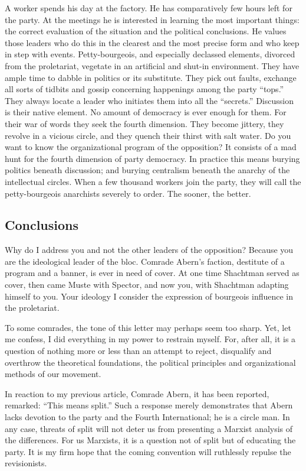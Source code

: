 A worker spends his day at the factory. He has comparatively few hours left for the party. At the meetings he is interested in learning the most important things: the correct evaluation of the situation and the political conclusions. He values those leaders who do this in the clearest and the most precise form and who keep in step with events. Petty-bourgeois, and especially declassed elements, divorced from the proletariat, vegetate in an artificial and shut-in environment. They have ample time to dabble in politics or its substitute. They pick out faults, exchange all sorts of tidbits and gossip concerning happenings among the party “tops.” They always locate a leader who initiates them into all the “secrets.” Discussion is their native element. No amount of democracy is ever enough for them. For their war of words they seek the fourth dimension. They become jittery, they revolve in a vicious circle, and they quench their thirst with salt water. Do you want to know the organizational program of the opposition? It consists of a mad hunt for the fourth dimension of party democracy. In practice this means burying politics beneath discussion; and burying centralism beneath the anarchy of the intellectual circles. When a few thousand workers join the party, they will call the petty-bourgeois anarchists severely to order. The sooner, the better.

\subsection*{Conclusions}

Why do I address you and not the other leaders of the opposition? Because you are the ideological leader of the bloc. Comrade Abern’s faction, destitute of a program and a banner, is ever in need of cover. At one time Shachtman served as cover, then came Muste with Spector, and now you, with Shachtman adapting himself to you. Your ideology I consider the expression of bourgeois influence in the proletariat.

To some comrades, the tone of this letter may perhaps seem too sharp. Yet, let me confess, I did everything in my power to restrain myself. For, after all, it is a question of nothing more or less than an attempt to reject, disqualify and overthrow the theoretical foundations, the political principles and organizational methods of our movement.

In reaction to my previous article, Comrade Abern, it has been reported, remarked: “This means split.” Such a response merely demonstrates that Abern lacks devotion to the party and the Fourth International; he is a circle man. In any case, threats of split will not deter us from presenting a Marxist analysis of the differences. For us Marxists, it is a question not of split but of educating the party. It is my firm hope that the coming convention will ruthlessly repulse the revisionists.


